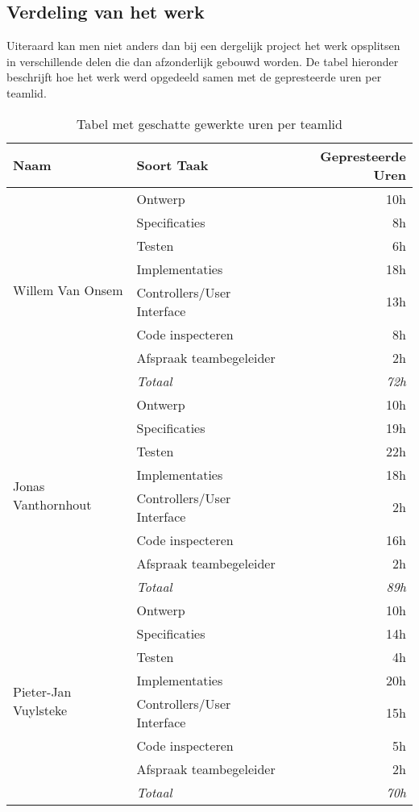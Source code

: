 \subsection{Verdeling van het werk}
Uiteraard kan men niet anders dan bij een dergelijk project het werk opsplitsen in verschillende delen die dan afzonderlijk gebouwd worden. De tabel hieronder beschrijft hoe het werk werd opgedeeld samen met de gepresteerde uren per teamlid.
\begin{table}[H]
\centering
\begin{tabular}{|l|l|r|}
\hline
\textbf{Naam}&\textbf{Soort Taak}&\textbf{Gepresteerde Uren}\\\hline\hline
\multirow{8}{*}{Willem Van Onsem}&Ontwerp&10h\\
&Specificaties&8h\\
&Testen&6h\\
&Implementaties&18h\\
&Controllers/User Interface&13h\\
&Code inspecteren&8h\\
&Afspraak teambegeleider&2h\\
&\textit{Totaal}&\textit{72h}\\\hline
\multirow{8}{*}{Jonas Vanthornhout}&Ontwerp&10h\\
&Specificaties&19h\\
&Testen&22h\\
&Implementaties&18h\\
&Controllers/User Interface&2h\\
&Code inspecteren&16h\\
&Afspraak teambegeleider&2h\\
&\textit{Totaal}&\textit{89h}\\\hline
\multirow{8}{*}{Pieter-Jan Vuylsteke}&Ontwerp&10h\\
&Specificaties&14h\\
&Testen&4h\\
&Implementaties&20h\\
&Controllers/User Interface&15h\\
&Code inspecteren&5h\\
&Afspraak teambegeleider&2h\\
&\textit{Totaal}&\textit{70h}\\\hline
\end{tabular}
\caption{Tabel met geschatte gewerkte uren per teamlid}
\label{tbl:workedHours}
\end{table}
